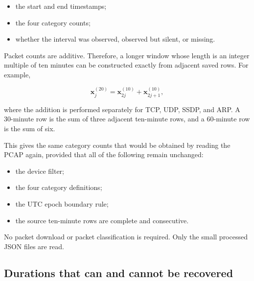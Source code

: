 \documentclass[11pt,a4paper]{article}
\begin{document}
\begin{itemize}
  \item the start and end timestamps;
  \item the four category counts;
  \item whether the interval was observed, observed but silent, or missing.
\end{itemize}

Packet counts are additive.  Therefore, a longer window whose length is an
integer multiple of ten minutes can be constructed exactly from adjacent saved
rows.  For example,

\[
\mathbf{x}^{(20)}_j
=
\mathbf{x}^{(10)}_{2j}
+
\mathbf{x}^{(10)}_{2j+1},
\]

where the addition is performed separately for TCP, UDP, SSDP, and ARP.  A
30-minute row is the sum of three adjacent ten-minute rows, and a 60-minute row
is the sum of six.

This gives the same category counts that would be obtained by reading the PCAP
again, provided that all of the following remain unchanged:

\begin{itemize}
  \item the device filter;
  \item the four category definitions;
  \item the UTC epoch boundary rule;
  \item the source ten-minute rows are complete and consecutive.
\end{itemize}

No packet download or packet classification is required.  Only the small
processed JSON files are read.

\subsection{Durations that can and cannot be recovered}
\end{document}
